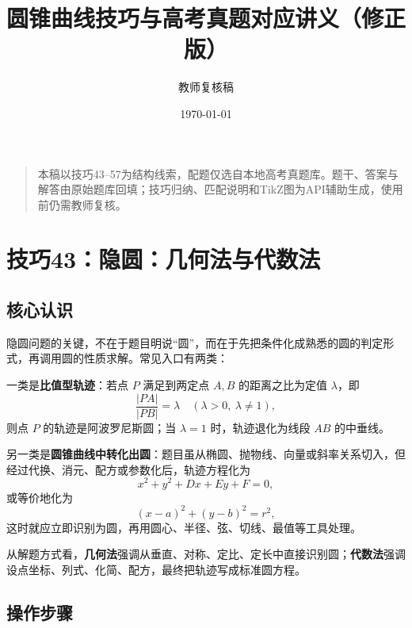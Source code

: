 \documentclass[UTF8,a4paper,11pt]{ctexart}
\title{圆锥曲线技巧与高考真题对应讲义（修正版）}
\author{教师复核稿}
\date{\today}
\begin{document}
\maketitle

\begin{quote}

本稿以技巧43--57为结构线索，配题仅选自本地高考真题库。题干、答案与解答由原始题库回填；技巧归纳、匹配说明和TikZ图为API辅助生成，使用前仍需教师复核。

\end{quote}

\tableofcontents

\clearpage

\section{技巧43：隐圆：几何法与代数法}

\subsection*{核心认识}

隐圆问题的关键，不在于题目明说“圆”，而在于先把条件化成熟悉的圆的判定形式，再调用圆的性质求解。常见入口有两类：

一类是\textbf{比值型轨迹}：若点 $P$ 满足到两定点 $A,B$ 的距离之比为定值 $\lambda$，即
\[
\frac{|PA|}{|PB|}=\lambda\quad(\lambda>0,\ \lambda\ne 1),
\]
则点 $P$ 的轨迹是阿波罗尼斯圆；当 $\lambda=1$ 时，轨迹退化为线段 $AB$ 的中垂线。

另一类是\textbf{圆锥曲线中转化出圆}：题目虽从椭圆、抛物线、向量或斜率关系切入，但经过代换、消元、配方或参数化后，轨迹方程化为
\[
x^2+y^2+Dx+Ey+F=0,
\]
或等价地化为
\[
(x-a)^2+(y-b)^2=r^2,
\]
这时就应立即识别为圆，再用圆心、半径、弦、切线、最值等工具处理。

从解题方式看，\textbf{几何法}强调从垂直、对称、定比、定长中直接识别圆；\textbf{代数法}强调设点坐标、列式、化简、配方，最终把轨迹写成标准圆方程。

\subsection*{操作步骤}
\end{document}
